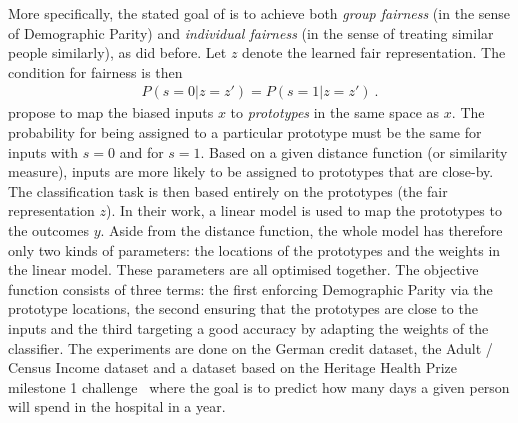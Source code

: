 More specifically, the stated goal of \citet{zemel2013learning} is
to achieve both \emph{group fairness} (in the sense of Demographic Parity)
and \emph{individual fairness} (in the sense of treating similar people similarly),
as \citet{dwork2012fairness} did before.
Let \(z\) denote the learned fair representation.
The condition for fairness is then
\begin{align}
  \label{eq:fair-representation}
  P(s=0|z=z') = P(s=1|z=z') ~.
\end{align}
\citet{zemel2013learning} propose to map the biased inputs \(x\) to \emph{prototypes} in the same space as \(x\).
The probability for being assigned to a particular prototype
must be the same for inputs with \(s=0\) and for \(s=1\).
Based on a given distance function (or similarity measure),
inputs are more likely to be assigned to prototypes that are close-by.
The classification task is then based entirely on the prototypes (the fair representation \(z\)).
In their work, a linear model is used to map the prototypes to the outcomes \(y\).
Aside from the distance function, the whole model has therefore only two kinds of parameters:
the locations of the prototypes and the weights in the linear model.
These parameters are all optimised together.
The objective function consists of three terms:
the first enforcing Demographic Parity via the prototype locations,
the second ensuring that the prototypes are close to the inputs
and the third targeting a good accuracy by adapting the weights of the classifier.
%
The experiments are done on the German credit dataset, the Adult / Census Income dataset
and a dataset based on the Heritage Health Prize milestone 1 challenge~\citep{heritagehealth}
where the goal is to predict how many days a given person will spend in the hospital in a year.


